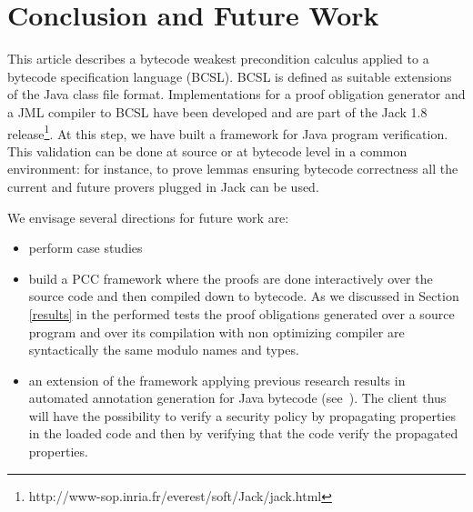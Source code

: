 \section{Conclusion and Future Work}\label{conclusion}
This article describes a bytecode weakest precondition calculus applied to a bytecode specification language (BCSL).
BCSL is defined as suitable extensions of the Java class file format.
Implementations for a proof obligation generator and a JML compiler to BCSL have been developed and are part of the Jack 1.8 release\footnote{http://www-sop.inria.fr/everest/soft/Jack/jack.html}.
At this step, we have built a framework for Java program verification. This validation can be done at source or at bytecode level in a common environment: for instance, to prove lemmas ensuring bytecode correctness all the current and future provers plugged in Jack can be used.


 We envisage several directions for future work are:
\begin{itemize}
  \item perform case studies
  \item  build a PCC framework where the proofs are done interactively over the source code
and then compiled down to bytecode. As we discussed in Section \ref{results} in the performed tests the 
proof obligations generated over a source program and over its compilation with non optimizing compiler are syntactically the same modulo names and types.  
  \item an extension of the framework applying previous research results in automated annotation generation for Java bytecode (see~\cite{PBBHL}). The client thus will have the possibility to verify a security policy by propagating properties in the loaded code and then by verifying that the code verify the propagated properties.

\end{itemize}



